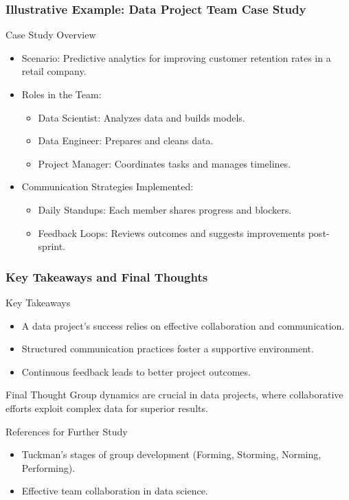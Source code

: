\documentclass[aspectratio=169]{beamer}
\begin{document}
\begin{frame}[fragile]
    \frametitle{Illustrative Example: Data Project Team Case Study}
    \begin{block}{Case Study Overview}
        \begin{itemize}
            \item Scenario: Predictive analytics for improving customer retention rates in a retail company.
            \item Roles in the Team:
            \begin{itemize}
                \item Data Scientist: Analyzes data and builds models.
                \item Data Engineer: Prepares and cleans data.
                \item Project Manager: Coordinates tasks and manages timelines.
            \end{itemize}
            \item Communication Strategies Implemented:
            \begin{itemize}
                \item Daily Standups: Each member shares progress and blockers.
                \item Feedback Loops: Reviews outcomes and suggests improvements post-sprint.
            \end{itemize}
        \end{itemize}
    \end{block}
\end{frame}

\begin{frame}[fragile]
    \frametitle{Key Takeaways and Final Thoughts}
    \begin{block}{Key Takeaways}
        \begin{itemize}
            \item A data project's success relies on effective collaboration and communication.
            \item Structured communication practices foster a supportive environment.
            \item Continuous feedback leads to better project outcomes.
        \end{itemize}
    \end{block}
    \begin{block}{Final Thought}
        Group dynamics are crucial in data projects, where collaborative efforts exploit complex data for superior results.
    \end{block}
    \begin{block}{References for Further Study}
        \begin{itemize}
            \item Tuckman's stages of group development (Forming, Storming, Norming, Performing).
            \item Effective team collaboration in data science.
        \end{itemize}
    \end{block}
\end{frame}
\end{document}
